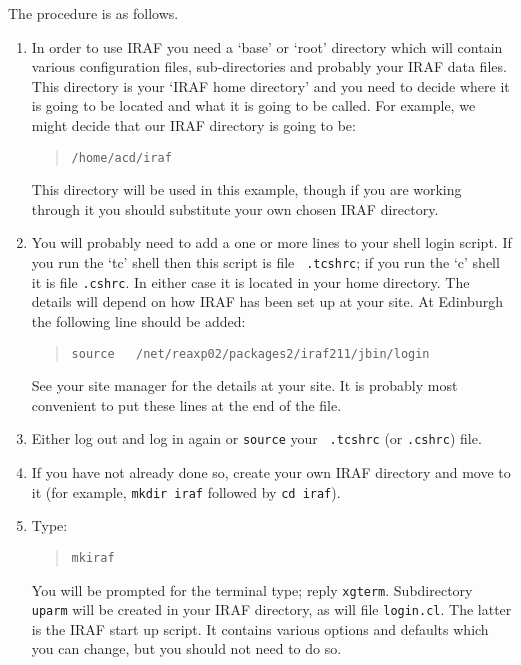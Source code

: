 \documentclass[twoside,11pt]{article}
\begin{document}
The procedure is as follows.

\begin{enumerate}

  \item In order to use IRAF you need a `base' or `root' directory
   which will contain various configuration files, sub-directories
   and probably your IRAF data files.  This directory is your `IRAF
   home directory' and you need to decide where it is going to be located
   and what it is going to be called.  For example, we might decide
   that our IRAF directory is going to be:

  \begin{quote}
   {\tt /home/acd/iraf}
  \end{quote}

   This directory will be used in this example, though if you are
   working through it you should substitute your own chosen IRAF
   directory.

  \item You will probably need to add a one or more lines to your shell
   login script.  If you run the `tc' shell then this script is file {\tt
   .tcshrc}; if you run the `c' shell it is file {\tt .cshrc}.  In either
   case it is located in your home directory.  The details will depend on
   how IRAF has been set up at your site.  At Edinburgh the following line
   should be added:

  \begin{quote}
   {\tt source ~ /net/reaxp02/packages2/iraf211/jbin/login}
  \end{quote}

   See your site manager for the details at your site.  It is probably most
   convenient to put these lines at the end of the file.

  \item Either log out and log in again or {\tt source} your {\tt
   .tcshrc} (or {\tt .cshrc}) file.

  \item If you have not already done so, create your own IRAF directory and
   move to it (for example, {\tt mkdir iraf} followed by {\tt cd iraf}).

  \item Type:

  \begin{quote}
   {\tt mkiraf}
  \end{quote}

   You will be prompted for the terminal type; reply {\tt xgterm}.
   Subdirectory {\tt uparm} will be created in your IRAF directory,
   as will file {\tt login.cl}.  The latter is the IRAF start up script.
   It contains various options and defaults which you can change, but
   you should not need to do so.


\end{enumerate}
\end{document}
